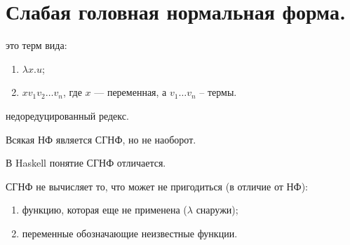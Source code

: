 \section{Слабая головная нормальная форма.}

\begin{definition}
это терм вида:
\begin{enumerate}
    \item $\lambda x. u$;
    \item $x v_1 v_2 \ldots v_n$, где $x$ --- переменная, а $v_1 \dots v_n$ – термы.
\end{enumerate}
\end{definition}

\begin{definition}[thunk]
недоредуцированный редекс.
\end{definition}

\begin{important}
Всякая НФ является СГНФ, но не наоборот.
\end{important}

\begin{important}
В Haskell понятие СГНФ отличается.
\end{important}

\begin{important}
СГНФ не вычисляет то, что может не пригодиться (в отличие от НФ):
\begin{enumerate}
    \item функцию, которая еще не применена ($\lambda$ снаружи);
    \item переменные обозначающие неизвестные функции.
\end{enumerate}
\end{important}

